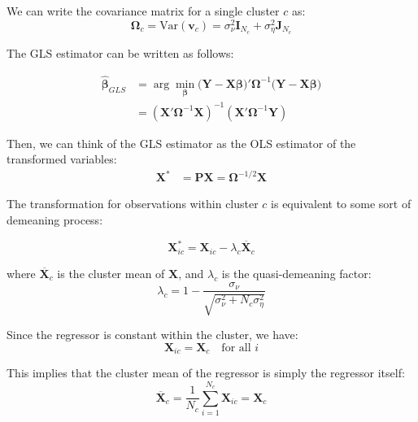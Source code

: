 \documentclass[12pt]{article}
\begin{document}
We can write the covariance matrix for a single cluster $c$ as:
\begin{equation}
    \boldsymbol{\Omega}_c = \text{Var}(\mathbf{v}_c) = \sigma_\nu^2 \mathbf{I}_{N_c} + \sigma_\eta^2 \mathbf{J}_{N_c}
\end{equation}


The GLS estimator can be written as follows:

\begin{align}
    \hat{\boldsymbol{\beta}}_{GLS} &= \arg\min_{\boldsymbol{\beta}} \bigl(\mathbf{Y}-\mathbf{X}\boldsymbol{\beta}\bigr)' \mathbf{\Omega}^{-1} \bigl(\mathbf{Y}-\mathbf{X}\boldsymbol{\beta}\bigr)\\
    &= (\mathbf{X}' \mathbf{\Omega}^{-1} \mathbf{X})^{-1} (\mathbf{X}' \mathbf{\Omega}^{-1} \mathbf{Y})
\end{align}

Then, we can think of the GLS estimator as the OLS estimator of the transformed variables:
\begin{align}
    \mathbf{X}^* &= \mathbf{P} \mathbf{X} = \mathbf{\Omega}^{-1/2} \mathbf{X}
\end{align}

The transformation for observations within cluster $c$ is equivalent to some sort of demeaning process:

\begin{equation}
    \mathbf{X}_{ic}^* = \mathbf{X}_{ic} - \lambda_c \overline{\mathbf{X}}_c
\end{equation}

where $\overline{\mathbf{X}}_c$ is the cluster mean of $\mathbf{X}$, and $\lambda_c$ is the quasi-demeaning factor:
\begin{equation}
    \lambda_c = 1 - \frac{\sigma_\nu}{\sqrt{\sigma_\nu^2 + N_c \sigma_\eta^2}}
\end{equation}

Since the regressor is constant within the cluster, we have:
\begin{equation}
    \mathbf{X}_{ic} = \mathbf{X}_c \quad \text{for all } i
\end{equation}

This implies that the cluster mean of the regressor is simply the regressor itself:
\begin{equation}
    \overline{\mathbf{X}}_c = \frac{1}{N_c} \sum_{i=1}^{N_c} \mathbf{X}_{ic} = \mathbf{X}_c
\end{equation}
\end{document}
